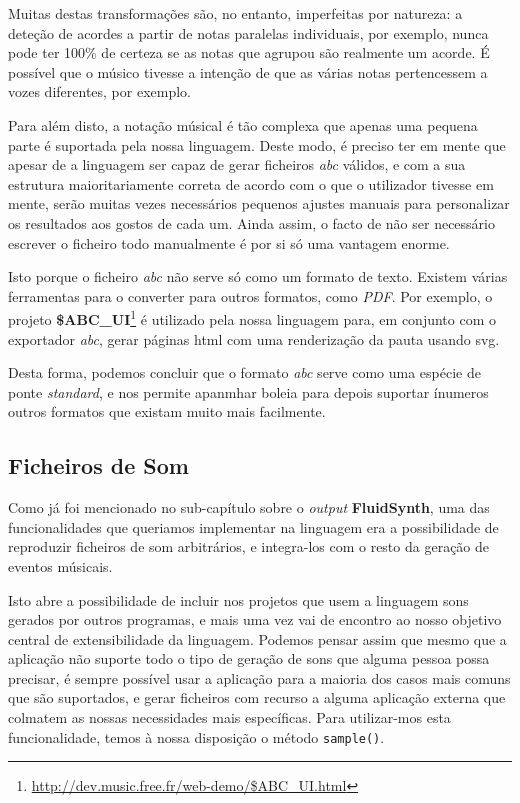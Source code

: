 Muitas destas transformações são, no entanto, imperfeitas por natureza: a deteção de acordes a partir de notas paralelas individuais, por exemplo, nunca pode ter 100\% de certeza se as notas que agrupou são realmente um acorde. É possível que o músico tivesse a intenção de que as várias notas pertencessem a vozes diferentes, por exemplo.

Para além disto, a notação músical é tão complexa que apenas uma pequena parte é suportada pela nossa linguagem. Deste modo, é preciso ter em mente que apesar de a linguagem ser capaz de gerar ficheiros \textit{abc} válidos, e com a sua estrutura maioritariamente correta de acordo com o que o utilizador tivesse em mente, serão muitas vezes necessários pequenos ajustes manuais para personalizar os resultados aos gostos de cada um. Ainda assim, o facto de não ser necessário escrever o ficheiro todo manualmente é por si só uma vantagem enorme.

Isto porque o ficheiro \textit{abc} não serve só como um formato de texto. Existem várias ferramentas para o converter para outros formatos, como \textit{PDF}. Por exemplo, o projeto \textbf{\$ABC\_UI}\footnote{\url{http://dev.music.free.fr/web-demo/\$ABC_UI.html}} é utilizado pela nossa linguagem para, em conjunto com o exportador \textit{abc}, gerar páginas \acrshort{html} com uma renderização da pauta usando \acrfull{svg}.

Desta forma, podemos concluir que o formato \textit{abc} serve como uma espécie de ponte \textit{standard}, e nos permite apanmhar boleia para depois suportar ínumeros outros formatos que existam muito mais facilmente.


\subsection{Ficheiros de Som}
Como já foi mencionado no sub-capítulo sobre o \textit{output} \textbf{FluidSynth}, uma das funcionalidades que queriamos implementar na linguagem era a possibilidade de reproduzir ficheiros de som arbitrários, e integra-los com o resto da geração de eventos músicais.

Isto abre a possibilidade de incluir nos projetos que usem a linguagem sons gerados por outros programas, e mais uma vez vai de encontro ao nosso objetivo central de extensibilidade da linguagem. Podemos pensar assim que mesmo que a aplicação não suporte todo o tipo de geração de sons que alguma pessoa possa precisar, é sempre possível usar a aplicação para a maioria dos casos mais comuns que são suportados, e gerar ficheiros com recurso a alguma aplicação externa que colmatem as nossas necessidades mais específicas. Para utilizar-mos esta funcionalidade, temos à nossa disposição o método \texttt{sample()}.

